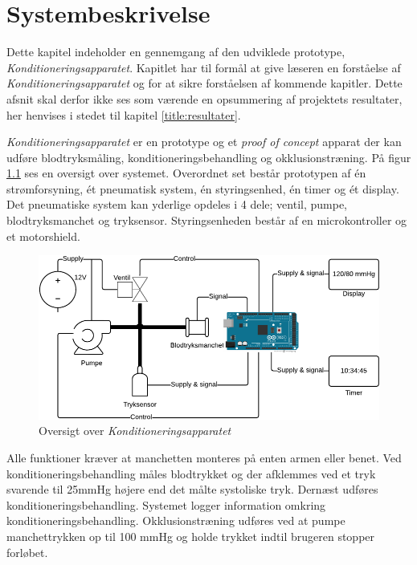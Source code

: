 \chapter{Systembeskrivelse}
Dette kapitel indeholder en gennemgang af den udviklede prototype, \textit{Konditioneringsapparatet}. Kapitlet har til formål at give læseren en forståelse af \textit{Konditioneringsapparatet} og for at sikre forståelsen af kommende kapitler. Dette afsnit skal derfor ikke ses som værende en opsummering af projektets resultater, her henvises i stedet til kapitel \ref{title:resultater}.

\textit{Konditioneringsapparatet} er en prototype og et \textit{proof of concept} apparat der kan udføre blodtryksmåling, konditioneringsbehandling og okklusionstræning. På figur \ref{fig:systemTegning} ses en oversigt over systemet. Overordnet set består prototypen af én strømforsyning, ét pneumatisk system, én styringsenhed, én timer og ét display. Det pneumatiske system kan yderlige opdeles i 4 dele; ventil, pumpe, blodtryksmanchet og tryksensor. Styringsenheden består af en microkontroller og et motorshield. 

\begin{figure}[H]
	\centering
	\includegraphics[width = \textwidth]{billeder/systemDrawing-crop.pdf}
	\caption{Oversigt over \textit{Konditioneringsapparatet}} \label{fig:systemTegning}
\end{figure}

Alle funktioner kræver at manchetten monteres på enten armen eller benet. Ved konditioneringsbehandling måles blodtrykket og der afklemmes ved et tryk svarende til 25mmHg højere end det målte systoliske tryk. Dernæst udføres konditioneringsbehandling. Systemet logger information omkring konditioneringsbehandling. Okklusionstræning udføres ved at pumpe manchettrykken op til 100 mmHg og holde trykket indtil brugeren stopper forløbet. 

